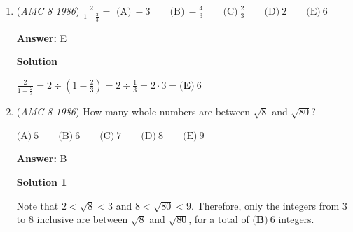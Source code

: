 \begin{enumerate}
 $\text{(A)}\ \text{10:00 p.m.} \qquad \text{(B)}\ \text{midnight} \qquad \text{(C)}\ \text{2:30 a.m.} \qquad \text{(D)}\ \text{4:40 a.m.} \qquad \text{(E)}\ \text{6:40 a.m.}$

 \textbf{Answer: }D



\textbf{Solution}

The contest lasts $1000$ minutes, which is $\frac{1000}{60} = 16\frac{2}{3}$ hours or $16$ hours and $40$ minutes.  Since the contest starts at $\text{12:00 p.m.}$, it ends at $\boxed{\textbf{(D)}\  \text{4:40 a.m.}}$




\textbf{Solution 2}

There are $60$ minutes in an hour. So, we can easily eliminate some of the choices by noting that noon is exactly $720$ minutes away from midnight. Since $720 < 1000$, we know that it cannot be A or B. Because midnight is $720$ minutes away, we know that the contest ended $1000 - 720 = 280$ minutes after midnight. The highest multiple of 60 that will fit into $280$ is $240$, which is $4 \times 60$, and the remainder is $40$ minutes, meaning that the contest ended at $4:40 \text{ a.m.}$
$4:40$ is $\boxed{\text{D}}$



	\item (\textit{AMC 8 1986}) $\frac{2}{1-\frac{2}{3}}=$
$\text{(A)}\ -3 \qquad \text{(B)}\ -\frac{4}{3} \qquad \text{(C)}\ \frac{2}{3} \qquad \text{(D)}\ 2 \qquad \text{(E)}\ 6$

 \textbf{Answer: }E



\textbf{Solution}

$\frac{2}{1-\frac{2}{3}} = 2 \div \left(1 - \frac{2}{3}\right) = 2 \div \frac{1}{3} = 2 \cdot 3 = \boxed{\textbf{(E)}\ 6}$



	\item (\textit{AMC 8 1986}) How many whole numbers are between $\sqrt{8}$ and $\sqrt{80}$?


 $\text{(A)}\ 5 \qquad \text{(B)}\ 6 \qquad \text{(C)}\ 7 \qquad \text{(D)}\ 8 \qquad \text{(E)}\ 9$

 \textbf{Answer: }B



\textbf{Solution 1}

Note that $2 < \sqrt{8} < 3$ and $8 < \sqrt{80} < 9$.  Therefore, only the integers from $3$ to $8$ inclusive are between $\sqrt{8}$ and $\sqrt{80}$, for a total of $\boxed{\textbf{(B)}\ 6}$ integers.


\end{enumerate}
